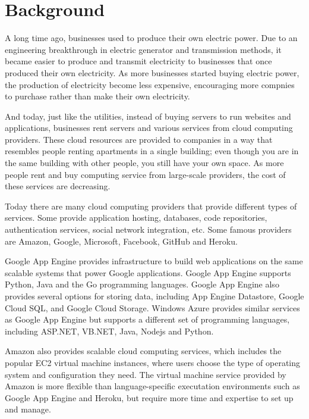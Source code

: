 
\section{Background}

A long time ago, businesses used to produce their own electric power.  Due to an engineering breakthrough in electric generator and transmission methods, it became easier to produce and transmit electricity to businesses that once produced their own electricity. As more businesses started buying electric power, the production of electricity become less expensive, encouraging more compnies to purchase rather than make their own electricity.

And today, just like the utilities, instead of buying servers to run websites and applications, businesses rent servers and various services from cloud computing providers. These cloud resources are provided to companies in a way that resembles people renting apartments in a single building; even though you are in the same building with other people, you still have your own space. As more people rent and buy computing service from large-scale providers, the cost of these services are decreasing. 

Today there are many cloud computing providers that provide different types of services. Some provide application hosting, databases, code repositories, authentication services, social network integration, etc.  Some famous providers are Amazon, Google, Microsoft, Facebook, GitHub and Heroku. 

Google App Engine provides infrastructure to build web applications on the same scalable systems that power Google applications.  Google App Engine supports Python, Java and the Go programming languages. Google App Engine also provides several options for storing data, including App Engine Datastore, Google Cloud SQL, and Google Cloud Storage. Windows Azure provides similar services as Google App Engine but supports a different set of programming languages, including ASP.NET, VB.NET, Java, Nodejs and Python.

Amazon also provides scalable cloud computing services, which includes the popular EC2 virtual machine instances, where users choose the type of operating system and configuration they need. The virtual machine service provided by Amazon is more flexible than language-specific executation environments such as Google App Engine and Heroku, but require more time and expertise to set up and manage. 

